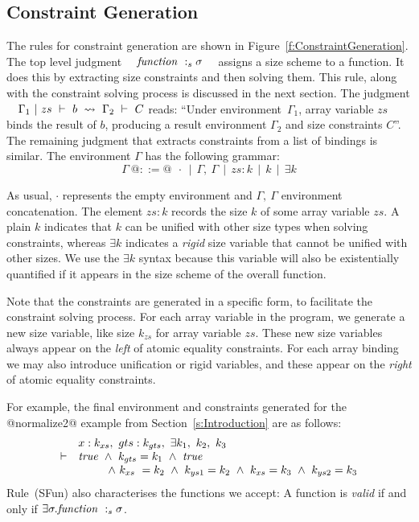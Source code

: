 \subsection{Constraint Generation}
The rules for constraint generation are shown in Figure~\ref{f:ConstraintGeneration}. The top level judgment ~~$\mathit{function} ~:_{s} \sigma$~~ assigns a size scheme to a function. It does this by extracting size constraints and then solving them. This rule, along with the constraint solving process is discussed in the next section. The judgment ~~$\Gamma_1 ~|~ zs ~\vdash~ b ~\leadsto~ \Gamma_2 ~\vdash~ C$ reads: ``Under environment~$\Gamma_1$, array variable $zs$ binds the result of $b$, producing a result environment $\Gamma_2$ and size constraints $C$''. The remaining judgment that extracts constraints from a list of bindings is similar. The environment $\Gamma$ has the following grammar:
$$
\Gamma~ @::=@ ~~\cdot ~~|~~ \Gamma,~ \Gamma ~~|~~ zs : k ~~|~~ k ~~|~~ \exists k
$$

As usual, $\cdot$ represents the empty environment and  $\Gamma,~ \Gamma$
environment concatenation. The element $zs : k$ records the size $k$ of some
array variable $zs$. A plain $k$ indicates that $k$ can be unified with other
size types when solving constraints, whereas $\exists k$ indicates a  \emph{rigid} size variable that cannot be unified with other sizes. We use the $\exists k$ syntax because this variable will also be existentially quantified if it appears in the size scheme of the overall function.

Note that the constraints are generated in a specific form, to facilitate the constraint solving process. For each array variable in the program, we generate a new size variable, like size $k_{zs}$ for array variable $zs$. These new size variables always appear on the \emph{left} of atomic equality constraints. For each array binding we may also introduce unification or rigid variables, and these appear on the \emph{right} of atomic equality constraints.

For example, the final environment and constraints generated for the @normalize2@ example from Section~\ref{s:Introduction} are as follows:
$$
\begin{array}{ll}
       & x : k_{xs},~ gts : k_{gts},~ \exists k_1,~ k_2,~ k_3 
\\
\vdash & \mathit{true} 
        ~\wedge~  k_{gts} = k_1
        ~\wedge~  \mathit{true}
\\     &~~~~~~~~ 
          \wedge~  k_{xs}  ~= k_2
        ~ \wedge~  k_{ys1}  = k_2 
        ~ \wedge~  k_{xs}   = k_3
        ~ \wedge~  k_{ys2}  = k_3
\end{array}
$$
Rule~(SFun) also characterises the functions we accept: A function is \emph{valid} if and only if $\exists \sigma. \mathit{function} ~:_{s} \sigma$. 

